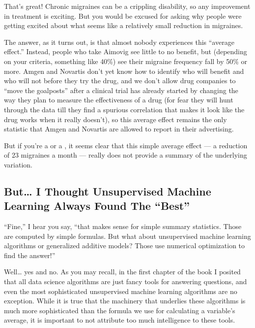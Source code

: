 \documentclass[letterpaper,10pt,english]{jupyterBook}
\begin{document}
\sphinxAtStartPar
{}

\sphinxAtStartPar
That’s great! Chronic migraines can be a crippling disability, so any improvement in treatment is exciting. But you would be excused for asking why people were getting  excited about what seems like a relatively small reduction in migraines.

\sphinxAtStartPar
The answer, as it turns out, is that almost nobody experiences this “average effect.” Instead,  people who take Aimovig see little to no benefit, but  (depending on your criteria, something like 40\%) see their migraine frequency fall by 50\% or more. Amgen and Novartis don’t yet know how to identify who will benefit and who will not before they try the drug, and we don’t allow drug companies to “move the goalposts” after a clinical trial has already started by changing the way they plan to measure the effectiveness of a drug (for fear they will hunt through the data till they find a spurious correlation that makes it look like the drug works when it really doesn’t), so this average effect remains the only statistic that Amgen and Novartis are allowed to report in their advertising.

\sphinxAtStartPar
But if you’re a  or a , it seems clear that this simple average effect — a reduction of 2\sphinxhyphen{}3 migraines a month — really does not provide a  summary of the underlying variation.


\subsection{But… I Thought Unsupervised Machine Learning Always Found The “Best”}
\label{\detokenize{30_questions/15_answering_exploratory_questions:but-i-thought-unsupervised-machine-learning-always-found-the-best}}
\sphinxAtStartPar
“Fine,” I hear you say, “that makes sense for simple summary statistics. Those are computed by simple formulas. But what about unsupervised machine learning algorithms or generalized additive models? Those use numerical optimization to find the  answer!”

\sphinxAtStartPar
Well… yes and no. As you may recall, in the first chapter of the book I posited that all data science algorithms are just fancy tools for answering questions, and even the most sophisticated unsupervised machine learning algorithms are no exception. While it is true that the machinery that underlies these algorithms is much more sophisticated than the formula we use for calculating a variable’s average, it is important to not attribute too much intelligence to these tools.
\end{document}
